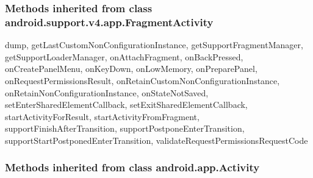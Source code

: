 \subsubsection{Methods inherited from class android.support.v4.app.FragmentActivity}

dump, getLastCustomNonConfigurationInstance, getSupportFragmentManager, getSupportLoaderManager, onAttachFragment, onBackPressed, onCreatePanelMenu, onKeyDown, onLowMemory, onPreparePanel, onRequestPermissionsResult, onRetainCustomNonConfigurationInstance, onRetainNonConfigurationInstance, onStateNotSaved, setEnterSharedElementCallback, setExitSharedElementCallback, startActivityForResult, startActivityFromFragment, supportFinishAfterTransition, supportPostponeEnterTransition, supportStartPostponedEnterTransition, validateRequestPermissionsRequestCode\\

\subsubsection{Methods inherited from class android.app.Activity}

